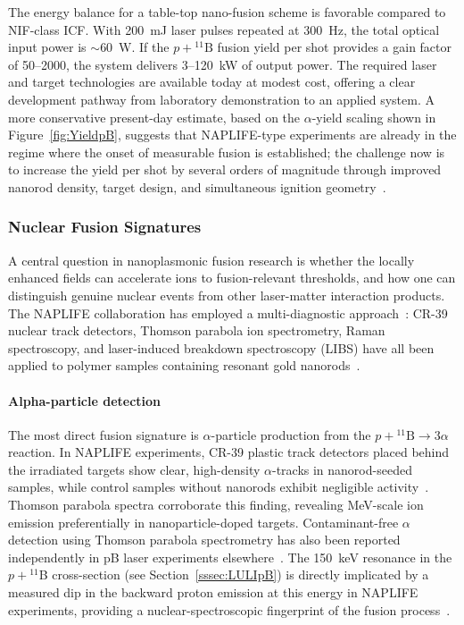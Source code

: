 \documentclass[particles,article,accept,pdftex,moreauthors]{Definitions/mdpi}
\newcommand{\rsec}[1]{Section~\ref{#1}}
\begin{document}
The energy balance for a table-top nano-fusion scheme is favorable compared to NIF-class ICF. With 200~mJ laser pulses repeated at 300~Hz, the total optical input power is $\sim$60~W. If the $p+{}^{11}\mathrm{B}$ fusion yield per shot provides a gain factor of 50--2000, the system delivers 3--120~kW of output power. The required laser and target technologies are available today at modest cost, offering a clear development pathway from laboratory demonstration to an applied system. A more conservative present-day estimate, based on the $\alpha$-yield scaling shown in Figure~\ref{fig:YieldpB}, suggests that NAPLIFE-type experiments are already in the regime where the onset of measurable fusion is established; the challenge now is to increase the yield per shot by several orders of magnitude through improved nanorod density, target design, and simultaneous ignition geometry~\cite{Csernai:2026MDPI,Csernai:2024Universe}.


\subsubsection{Nuclear Fusion Signatures}\label{sssec:FusionSigs}

A central question in nanoplasmonic fusion research is whether the locally enhanced fields can accelerate ions to fusion-relevant thresholds, and how one can distinguish genuine nuclear events from other laser-matter interaction products. The NAPLIFE collaboration has employed a multi-diagnostic approach~\cite{mcnamee2025contaminant,Csernai:2023PRE}: CR-39 nuclear track detectors, Thomson parabola ion spectrometry, Raman spectroscopy, and laser-induced breakdown spectroscopy (LIBS) have all been applied to polymer samples containing resonant gold nanorods~\cite{tamas2025nanofusion,Kroo2024pB}.

\paragraph*{\bf Alpha-particle detection}
The most direct fusion signature is $\alpha$-particle production from the $p+{}^{11}\mathrm{B}\to 3\alpha$ reaction. In NAPLIFE experiments, CR-39 plastic track detectors placed behind the irradiated targets show clear, high-density $\alpha$-tracks in nanorod-seeded samples, while control samples without nanorods exhibit negligible activity~\cite{Kroo2024pB}. Thomson parabola spectra corroborate this finding, revealing MeV-scale ion emission preferentially in nanoparticle-doped targets. Contaminant-free $\alpha$ detection using Thomson parabola spectrometry has also been reported independently in pB laser experiments elsewhere~\cite{mcnamee2025contaminant}. The 150~keV resonance in the $p+{}^{11}$B cross-section (see \rsec{sssec:LULIpB}) is directly implicated by a measured dip in the backward proton emission at this energy in NAPLIFE experiments, providing a nuclear-spectroscopic fingerprint of the fusion process~\cite{Kroo2024pB}.
\end{document}
